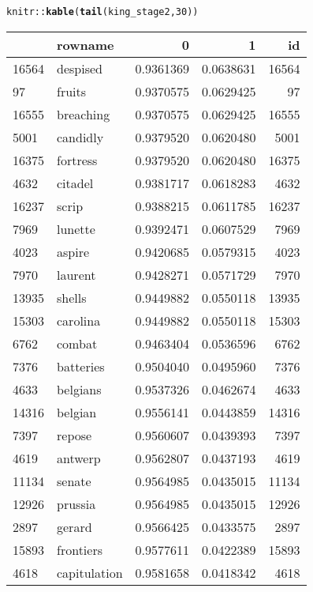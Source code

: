 \documentclass{article}\usepackage[]{graphicx}\usepackage[]{color}
\makeatletter
\newcommand{\hlnum}[1]{\textcolor[rgb]{0.686,0.059,0.569}{#1}}%
\newcommand{\hlopt}[1]{\textcolor[rgb]{0,0,0}{#1}}%
\newcommand{\hlstd}[1]{\textcolor[rgb]{0.345,0.345,0.345}{#1}}%
\newcommand{\hlkwd}[1]{\textcolor[rgb]{0.737,0.353,0.396}{\textbf{#1}}}%
\newenvironment{kframe}{%
 \def\at@end@of@kframe{}%
 \ifinner\ifhmode%
  \def\at@end@of@kframe{\end{minipage}}%
  \begin{minipage}{\columnwidth}%
 \fi\fi%
 \def\FrameCommand##1{\hskip\@totalleftmargin \hskip-\fboxsep
 \colorbox{shadecolor}{##1}\hskip-\fboxsep
     \hskip-\linewidth \hskip-\@totalleftmargin \hskip\columnwidth}%
 \MakeFramed {\advance\hsize-\width
   \@totalleftmargin\z@ \linewidth\hsize
   \@setminipage}}%
 {\par\unskip\endMakeFramed%
 \at@end@of@kframe}
\newenvironment{knitrout}{}{} %
\makeatother
\begin{document}
\begin{knitrout}
\begin{kframe}\begin{alltt}
\hlstd{knitr}\hlopt{::}\hlkwd{kable}\hlstd{(}\hlkwd{tail}\hlstd{(king_stage2,} \hlnum{30}\hlstd{))}
\end{alltt}
\end{kframe}
\begin{tabular}{l|l|r|r|r}
\hline
  & rowname & 0 & 1 & id\\
\hline
16564 & despised & 0.9361369 & 0.0638631 & 16564\\
\hline
97 & fruits & 0.9370575 & 0.0629425 & 97\\
\hline
16555 & breaching & 0.9370575 & 0.0629425 & 16555\\
\hline
5001 & candidly & 0.9379520 & 0.0620480 & 5001\\
\hline
16375 & fortress & 0.9379520 & 0.0620480 & 16375\\
\hline
4632 & citadel & 0.9381717 & 0.0618283 & 4632\\
\hline
16237 & scrip & 0.9388215 & 0.0611785 & 16237\\
\hline
7969 & lunette & 0.9392471 & 0.0607529 & 7969\\
\hline
4023 & aspire & 0.9420685 & 0.0579315 & 4023\\
\hline
7970 & laurent & 0.9428271 & 0.0571729 & 7970\\
\hline
13935 & shells & 0.9449882 & 0.0550118 & 13935\\
\hline
15303 & carolina & 0.9449882 & 0.0550118 & 15303\\
\hline
6762 & combat & 0.9463404 & 0.0536596 & 6762\\
\hline
7376 & batteries & 0.9504040 & 0.0495960 & 7376\\
\hline
4633 & belgians & 0.9537326 & 0.0462674 & 4633\\
\hline
14316 & belgian & 0.9556141 & 0.0443859 & 14316\\
\hline
7397 & repose & 0.9560607 & 0.0439393 & 7397\\
\hline
4619 & antwerp & 0.9562807 & 0.0437193 & 4619\\
\hline
11134 & senate & 0.9564985 & 0.0435015 & 11134\\
\hline
12926 & prussia & 0.9564985 & 0.0435015 & 12926\\
\hline
2897 & gerard & 0.9566425 & 0.0433575 & 2897\\
\hline
15893 & frontiers & 0.9577611 & 0.0422389 & 15893\\
\hline
4618 & capitulation & 0.9581658 & 0.0418342 & 4618\\

\end{tabular}
\end{knitrout}
\end{document}
